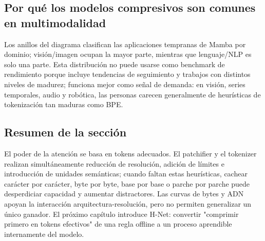 \subsection{Por qué los modelos compresivos son comunes en multimodalidad}

Los anillos del diagrama clasifican las aplicaciones tempranas de Mamba por dominio; visión/imagen ocupan la mayor parte, mientras que lenguaje/NLP es solo una parte. Esta distribución no puede usarse como benchmark de rendimiento porque incluye tendencias de seguimiento y trabajos con distintos niveles de madurez; funciona mejor como señal de demanda: en visión, series temporales, audio y robótica, las personas carecen generalmente de heurísticas de tokenización tan maduras como BPE.



\subsection{Resumen de la sección}

El poder de la atención se basa en tokens adecuados. El patchifier y el tokenizer realizan simultáneamente reducción de resolución, adición de límites e introducción de unidades semánticas; cuando faltan estas heurísticas, cachear carácter por carácter, byte por byte, base por base o parche por parche puede desperdiciar capacidad y aumentar distractores. Las curvas de bytes y ADN apoyan la interacción arquitectura-resolución, pero no permiten generalizar un único ganador. El próximo capítulo introduce H-Net: convertir "comprimir primero en tokens efectivos" de una regla offline a un proceso aprendible internamente del modelo.


